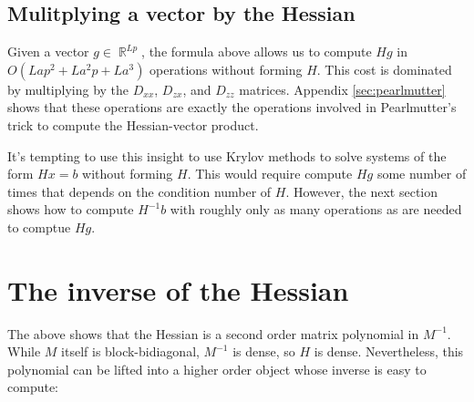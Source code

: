 \documentclass{article}
\newcommand{\R}{\mathop{\mathbb{R}}}
\begin{document}
\subsection{Mulitplying a vector by the Hessian}

Given a vector $g \in \R^{Lp}$, the formula above allows us to compute $H g$ in
$O\left(Lap^2 + L a^2p +La^3\right)$ operations without forming $H$. This cost
is dominated by multiplying by the $D_{xx}$, $D_{zx}$, and $D_{zz}$ matrices.
Appendix \ref{sec:pearlmutter} shows that these operations are exactly the
operations involved in Pearlmutter's trick to compute the Hessian-vector
product.

It's tempting to use this insight to use Krylov methods to solve systems of the
form $H x = b$ without forming $H$. This would require compute $H g$ some
number of times that depends on the condition number of $H$. However, the next
section shows how to compute $H^{-1} b$ with roughly only as many operations as
are needed to comptue $H g$.

\section{The inverse of the Hessian}

The above shows that the Hessian is a second order matrix polynomial in
$M^{-1}$. While $M$ itself is block-bidiagonal, $M^{-1}$ is dense, so $H$ is
dense. Nevertheless, this polynomial can be lifted into a higher order object
whose inverse is easy to compute:
\end{document}

